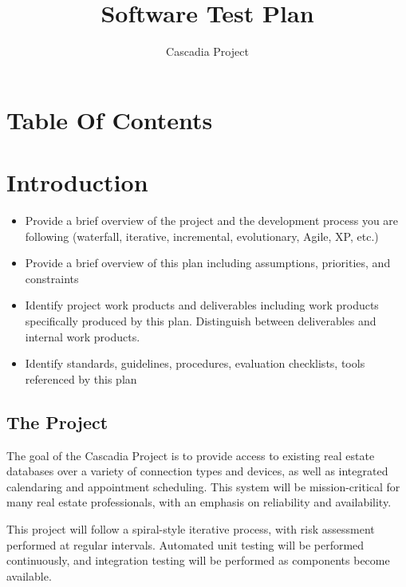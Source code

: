 \documentclass[11pt]{report}
\begin{document}
\date{Cascadia Project} 
\title{Software Test Plan} 
\maketitle


\chapter{Table Of Contents}
\tableofcontents
\clearpage


\chapter{Introduction}
\begin{itemize}
\item Provide a brief overview of the project and the development process you are following
  (waterfall, iterative, incremental, evolutionary, Agile, XP, etc.)
\item Provide a brief overview of this plan including assumptions, priorities, and constraints
\item Identify project work products and deliverables including work products specifically produced
  by this plan. Distinguish between deliverables and internal work products.
\item Identify standards, guidelines, procedures, evaluation checklists, tools referenced by this
  plan
\end{itemize}


\section{The Project}
The goal of the Cascadia Project is to provide access to existing real estate databases over a
variety of connection types and devices, as well as integrated calendaring and appointment
scheduling.  This system will be mission-critical for many real estate professionals, with an
emphasis on reliability and availability.

This project will follow a spiral-style iterative process, with risk assessment performed at regular
intervals.  Automated unit testing will be performed continuously, and integration testing will be
performed as components become available.
\end{document}
